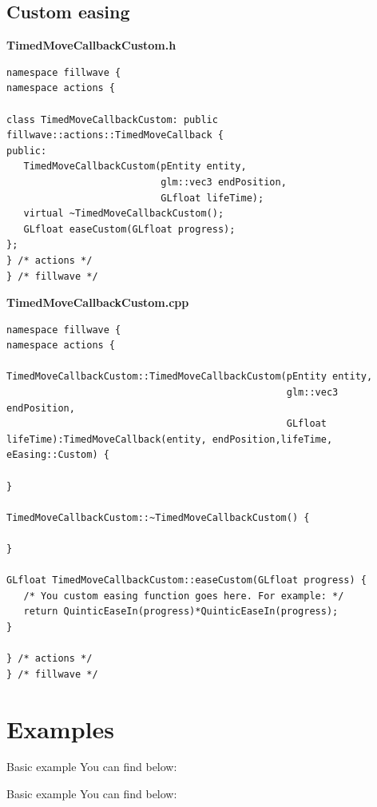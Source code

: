 \documentclass{article}
\begin{document}
\subsection{Custom easing}\label{sec:Custom easing}
\textbf{TimedMoveCallbackCustom.h}
\begin{lstlisting}
namespace fillwave {
namespace actions {

class TimedMoveCallbackCustom: public fillwave::actions::TimedMoveCallback {
public:
   TimedMoveCallbackCustom(pEntity entity,
                           glm::vec3 endPosition,
                           GLfloat lifeTime);
   virtual ~TimedMoveCallbackCustom();
   GLfloat easeCustom(GLfloat progress);
};
} /* actions */
} /* fillwave */
\end{lstlisting}
\textbf{TimedMoveCallbackCustom.cpp}
\begin{lstlisting}
namespace fillwave {
namespace actions {

TimedMoveCallbackCustom::TimedMoveCallbackCustom(pEntity entity,
                                                 glm::vec3 endPosition,
                                                 GLfloat lifeTime):TimedMoveCallback(entity, endPosition,lifeTime, eEasing::Custom) {

}

TimedMoveCallbackCustom::~TimedMoveCallbackCustom() {

}

GLfloat TimedMoveCallbackCustom::easeCustom(GLfloat progress) {
   /* You custom easing function goes here. For example: */
   return QuinticEaseIn(progress)*QuinticEaseIn(progress);
}

} /* actions */
} /* fillwave */
\end{lstlisting}

\section{Examples}

Basic example You can find below:


Basic example You can find below:
\newpage
\end{document}
